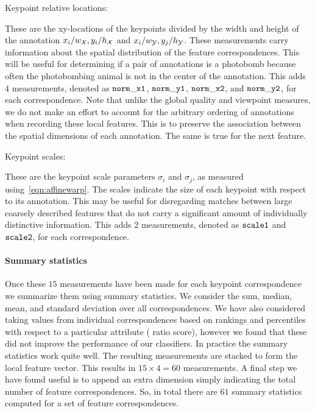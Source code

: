 \begin{itemln}
    \item Keypoint relative locations:

        These are the xy-locations of the keypoints divided by the width and height of the annotation  %
        $x_i / w_{\mathcal{X}}, y_i / h_{\mathcal{X}}$ and $x_i / w_{\mathcal{Y}}, y_j / h_{\mathcal{Y}}$.
        These measurements carry information about the spatial distribution of the feature correspondences.
        This will be useful for determining if a pair of annotations is a photobomb because often the
          photobombing animal is not in the center of the annotation.
        This adds $4$ measurements, denoted as $\tt{norm\_x1}$, $\tt{norm\_y1}$, $\tt{norm\_x2}$, and
          $\tt{norm\_y2}$, for each correspondence.
        Note that unlike the global quality and viewpoint measures, we do not make an effort to account for the
          arbitrary ordering of annotations when recording these local features.
        This is to preserve the association between the spatial dimensions of each annotation.
        The same is true for the next feature.

    \item Keypoint scales:

        These are the keypoint scale parameters $\sigma_i$ and $\sigma_j$, as measured
          using~\cref{eqn:affinewarp}.
        The scales indicate the size of each keypoint with respect to its annotation.
        This may be useful for disregarding matches between large coarsely described features that do not carry a
          significant amount of individually distinctive information.
        This adds $2$ measurements, denoted as $\tt{scale1}$ and $\tt{scale2}$, for each correspondence.

\end{itemln}

\paragraph{Summary statistics}
Once these $15$ measurements have been made for each keypoint correspondence we summarize them using summary
  statistics.
We consider the sum, median, mean, and standard deviation over all correspondences.
We have also considered taking values from individual correspondences based on rankings and percentiles with
  respect to a particular attribute (\eg{} ratio score), however we found that these did not improve the
  performance of our classifiers.
In practice the summary statistics work quite well.
The resulting measurements are stacked to form the local feature vector.
This results in $15 \times 4 = 60$ measurements.
A final step we have found useful is to append an extra dimension simply indicating the total number of feature
  correspondences.
So, in total there are $61$ summary statistics computed for a set of feature correspondences.

